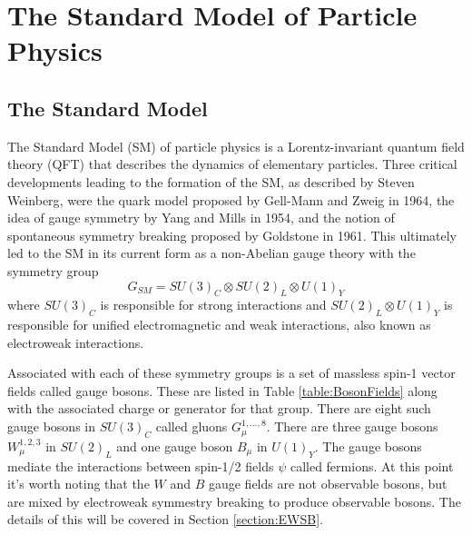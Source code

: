 \chapter{The Standard Model of Particle Physics}

\section{The Standard Model}

The Standard Model (SM) of particle physics is a Lorentz-invariant quantum field theory (QFT) that describes the dynamics of elementary particles.  Three critical developments leading to the formation of the SM, as described by Steven Weinberg\cite{Weinberg:2004kv}, were the quark model proposed by Gell-Mann\cite{GellMann:1964nj} and Zweig\cite{Zweig:1964jf} in 1964, the idea of gauge symmetry by Yang and Mills\cite{Yang:1954ek} in 1954, and the notion of spontaneous symmetry breaking proposed by Goldstone\cite{Goldstone:1961eq} in 1961.  This ultimately led to the SM in its current form as a non-Abelian gauge theory with the symmetry group
\begin{equation}
	\label{equation:gaugesymmetry}
	G_{SM} = SU(3)_C \otimes SU(2)_L \otimes U(1)_Y
\end{equation}
where $SU(3)_C$ is responsible for strong interactions and $SU(2)_L \otimes U(1)_Y$ is responsible for unified electromagnetic and weak interactions, also known as electroweak interactions.

Associated with each of these symmetry groups is a set of massless spin-1 vector fields called gauge bosons.  These are listed in Table \ref{table:BosonFields} along with the associated charge or generator for that group.  There are eight such gauge bosons in $SU(3)_C$ called gluons $G_\mu^{1,...,8}$.  There are three gauge bosons $W_\mu^{1,2,3}$ in $SU(2)_L$ and one gauge boson $B_\mu$ in $U(1)_Y$.  The gauge bosons mediate the interactions between spin-1/2 fields $\psi$ called fermions.  At this point it's worth noting that the $W$ and $B$ gauge fields are not observable bosons, but are mixed by electroweak symmestry breaking to produce observable bosons.  The details of this will be covered in Section \ref{section:EWSB}.


